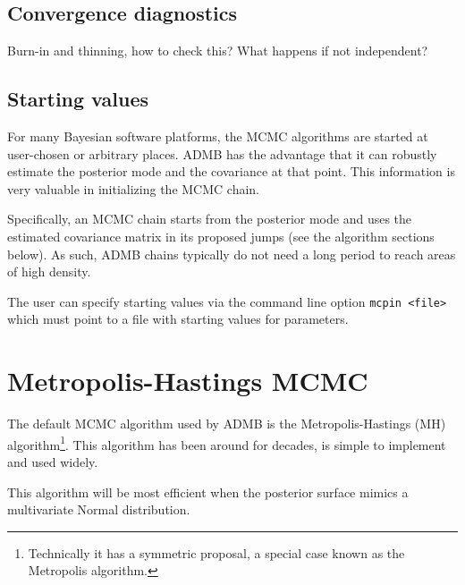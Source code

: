 \documentclass{article}\usepackage[]{graphicx}\usepackage[]{color}
\begin{document}

\subsection{Convergence diagnostics} \label{sec:diag}
Burn-in and thinning, how to check this? What happens if not
independent?

\subsection{Starting values}\label{sec:startvals}
For many Bayesian software platforms, the MCMC algorithms
are started at user-chosen or arbitrary places. ADMB has the
advantage that it can robustly estimate the posterior mode
and the covariance at that point. This information is very
valuable in initializing the MCMC chain.

Specifically, an MCMC chain starts from the posterior mode
and uses the estimated covariance matrix in its proposed
jumps (see the algorithm sections below). As such, ADMB
chains typically do not need a long period to reach areas of
high density.

The user can specify starting values via the command line
option \texttt{mcpin <file>} which must point to a file with
starting values for parameters.

\section{Metropolis-Hastings MCMC}\label{sec:MH}
The default MCMC algorithm used by ADMB is the
Metropolis-Hastings (MH) algorithm\footnote{Technically it
  has a symmetric proposal, a special case known as the
  Metropolis algorithm.}. This algorithm has been around for
decades, is simple to implement and used widely.

This algorithm will be most efficient when the posterior
surface mimics a multivariate Normal distribution.
\end{document}

